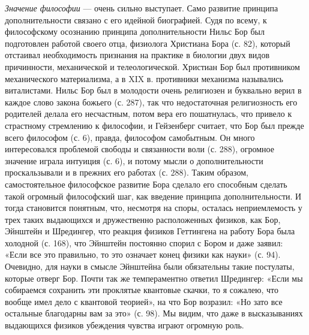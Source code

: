 \emph{Значение философии}  --- очень  сильно выступает.  Само развитие
принципа дополнительности  связано с  его идейной биографией.  Судя по
всему, к  философскому осознанию  принципа дополнительности  Нильс Бор
был подготовлен работой своего отца, физиолога Христиана Бора (с. 82),
который  отстаивал  необходимость  признания на  практике  в  биологии
двух видов  причинности, механической и телеологической.  Христиан Бор
был  противником механического  материализма,  а в  XIX в.  противники
механизма  назывались виталистами.  Нильс  Бор был  в молодости  очень
религиозен  и  буквально  верил  в каждое  слово  закона  божьего  (с.
287),  так что  недостаточная религиозность  его родителей  делала его
несчастным,  потом  вера его  пошатнулась,  что  привело к  страстному
стремлению  к философии,  и  Гейзенберг считает,  что  Бор был  прежде
всего  философом  (с.  6),  правда,  философом  самобытным.  Он  много
интересовался проблемой свободы и  связанности воли (с. 288), огромное
значение играла  интуиция (с.  6), и  потому мысли  о дополнительности
проскальзывали  и  в прежних  его  работах  (с. 288).  Таким  образом,
самостоятельное  философское  развитие   Бора  сделало  его  способным
сделать  такой   огромный  философский  шаг,  как   введение  принципа
дополнительности.  И  тогда  становится  понятным,  что,  несмотря  на
споры, осталась неприемлемость у  трех таких выдающихся и дружественно
расположенных  физиков, как  Бор,  Эйнштейн и  Шредингер, что  реакция
физиков Геттингена на работу Бора была холодной (с. 168), что Эйнштейн
постоянно спорил  с Бором и даже  заявил: «Если все это  правильно, то
это означает  конец физики как науки»  (с. 94). Очевидно, для  науки в
смысле Эйнштейна были обязательны такие постулаты, которые отверг Бор.
Почти  так же  темпераментно  ответил Шредингер:  «Если мы  собираемся
сохранить эти  проклятые квантовые  скачки, то  я сожалею,  что вообще
имел дело  с квантовой  теорией», на  что Бор  возразил: «Но  зато все
остальные  благодарны вам  за  это»  (с. 98).  Мы  видим,  что даже  в
высказываниях  выдающихся физиков  убеждения  чувства играют  огромную
роль.

